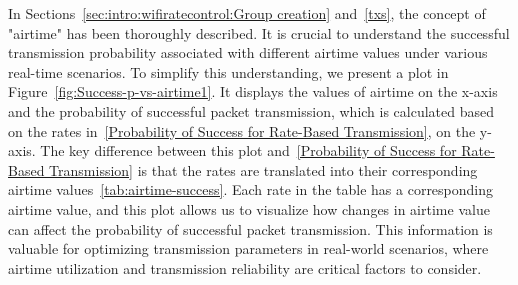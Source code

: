 In Sections~\ref{sec:intro:wifiratecontrol:Group creation} and~\ref{txs}, the concept of "airtime" has been thoroughly described. It is crucial to understand the successful transmission probability associated with different airtime values under various real-time scenarios. To simplify this understanding, we present a plot in Figure~\ref{fig:Success-p-vs-airtime1}. It displays the values of airtime on the x-axis and the probability of successful packet transmission, which is calculated based on the rates in~\ref{Probability of Success for Rate-Based Transmission}, on the y-axis. The key difference between this plot and~\ref{Probability of Success for Rate-Based Transmission} is that the rates are translated into their corresponding airtime values~\ref{tab:airtime-success}. Each rate in the table has a corresponding airtime value, and this plot allows us to visualize how changes in airtime value can affect the probability of successful packet transmission. This information is valuable for optimizing transmission parameters in real-world scenarios, where airtime utilization and transmission reliability are critical factors to consider.
\newpage
